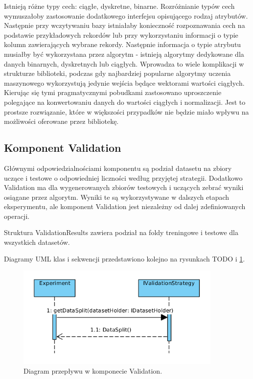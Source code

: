 \documentclass[12pt]{article}
\begin{document}
Istnieją różne typy cech: ciągłe, dyskretne, binarne. Rozróżnianie typów cech wymuszałoby zastosowanie dodatkowego interfejsu opisującego rodzaj atrybutów. Następnie przy wczytywaniu bazy istniałaby konieczność rozpoznawania cech na podstawie przykładowych rekordów lub przy wykorzystaniu informacji o typie kolumn zawierających wybrane rekordy. Następnie informacja o typie atrybutu musiałby być wykorzystana przez algorytm - istnieją algorytmy dedykowane dla danych binarnych, dyskretnych lub ciągłych. Wprowadza to wiele komplikacji w strukturze biblioteki, podczas gdy najbardziej popularne algorytmy uczenia maszynowego wykorzystują jedynie wejścia będące wektorami wartości ciągłych. Kierując się tymi pragmatycznymi pobudkami zastosowano uproszczenie polegające na konwertowaniu danych do wartości ciągłych i normalizacji. Jest to prostsze rozwiązanie, które w większości przypadków nie będzie miało wpływu na możliwości oferowane przez bibliotekę.

\subsection{Komponent Validation}

Głównymi odpowiedzialnościami komponentu są podział datasetu na zbiory uczące i testowe o odpowiedniej liczności według przyjętej strategii. Dodatkowo Validation ma dla wygenerowanych zbiorów testowych i uczących zebrać wyniki osiągane przez algorytm. Wyniki te są wykorzystywane w dalszych etapach eksperymentu, ale komponent Validation jest niezależny od dalej zdefiniowanych operacji.

Struktura ValidationResults zawiera podział na foldy treningowe i testowe dla wszystkich datasetów.

Diagramy UML klas i sekwencji przedstawiono kolejno na rysunkach TODO i \ref{fig:sequenceValidation}.

\begin{figure}
	\centering
	\includegraphics[width=0.9\textwidth]{img/sequenceValidation.png}
	\caption{Diagram przepływu w komponecie Validation.}
	\label{fig:sequenceValidation}
\end{figure}
\end{document}
